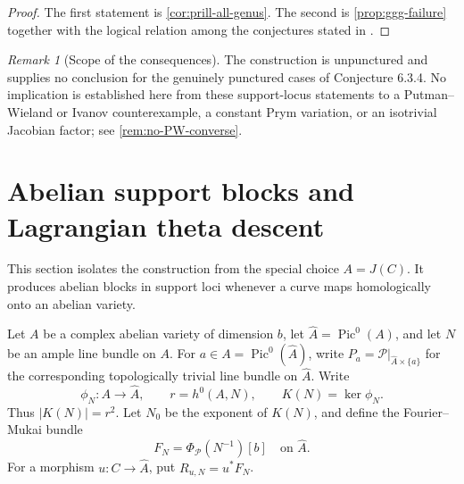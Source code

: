 \documentclass[11pt,reqno]{amsart}
\numberwithin{equation}{section}
\theoremstyle{remark}
\newtheorem{remark}[remark]{Remark}
\DeclareMathOperator{\Pic}{Pic}
\begin{document}
\begin{proof}
The first statement is \cref{cor:prill-all-genus}.  The second is
\cref{prop:ggg-failure} together with the logical relation among the
conjectures stated in \cite[\S6.3]{LittMotives}.
\end{proof}

\begin{remark}[Scope of the consequences]\label{rem:adjacent-scope}
The construction is unpunctured and supplies no conclusion for the
genuinely punctured cases of Conjecture 6.3.4.  No implication is
established here from these support-locus statements to a
Putman--Wieland or Ivanov counterexample, a constant Prym variation, or
an isotrivial Jacobian factor; see \cref{rem:no-PW-converse}.
\end{remark}

\section{Abelian support blocks and Lagrangian theta descent}

This section isolates the construction from the special choice
\(A=J(C)\).  It produces abelian blocks in support loci whenever a curve
maps homologically onto an abelian variety.

Let \(A\) be a complex abelian variety of dimension \(b\), let
\(\widehat A=\Pic^0(A)\), and let \(N\) be an ample line bundle on \(A\).
For \(a\in A=\Pic^0(\widehat A)\), write
\(P_a=\mathcal P|_{\widehat A\times\{a\}}\) for the corresponding
topologically trivial line bundle on \(\widehat A\).
Write
\[
 \phi_N\colon A\longrightarrow\widehat A,\qquad
 r=h^0(A,N),\qquad K(N)=\ker\phi_N.
\tag{8.1}\label{eq:general-polarization}
\]
Thus \(|K(N)|=r^2\).  Let \(N_0\) be the exponent of \(K(N)\), and define
the Fourier--Mukai bundle
\[
 F_N=\Phi_{\mathcal P}(N^{-1})[b]
\quad\text{on }\widehat A.
\tag{8.2}\label{eq:general-FM}
\]
For a morphism \(u\colon C\to\widehat A\), put \(R_{u,N}=u^*F_N\).
\end{document}
